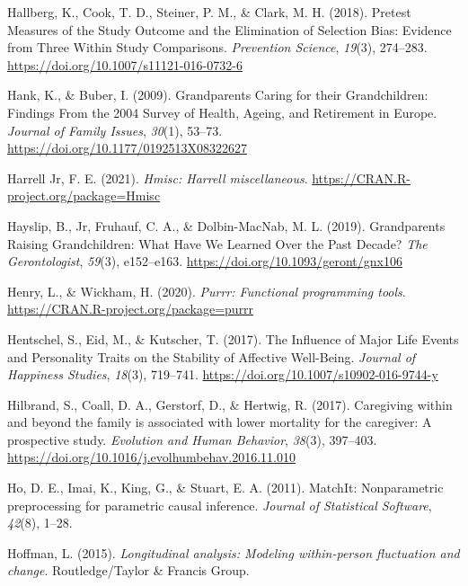 \documentclass[
  english,
  man,floatsintext]{apa7}
\begin{document}
\leavevmode\hypertarget{ref-hallbergPretestMeasuresStudy2018}{}%
Hallberg, K., Cook, T. D., Steiner, P. M., \& Clark, M. H. (2018). Pretest Measures of the Study Outcome and the Elimination of Selection Bias: Evidence from Three Within Study Comparisons. \emph{Prevention Science}, \emph{19}(3), 274--283. \url{https://doi.org/10.1007/s11121-016-0732-6}

\leavevmode\hypertarget{ref-hankGrandparentsCaringTheir2009}{}%
Hank, K., \& Buber, I. (2009). Grandparents Caring for their Grandchildren: Findings From the 2004 Survey of Health, Ageing, and Retirement in Europe. \emph{Journal of Family Issues}, \emph{30}(1), 53--73. \url{https://doi.org/10.1177/0192513X08322627}

\leavevmode\hypertarget{ref-R-Hmisc}{}%
Harrell Jr, F. E. (2021). \emph{Hmisc: Harrell miscellaneous}. \url{https://CRAN.R-project.org/package=Hmisc}

\leavevmode\hypertarget{ref-hayslipGrandparentsRaisingGrandchildren2019}{}%
Hayslip, B., Jr, Fruhauf, C. A., \& Dolbin-MacNab, M. L. (2019). Grandparents Raising Grandchildren: What Have We Learned Over the Past Decade? \emph{The Gerontologist}, \emph{59}(3), e152--e163. \url{https://doi.org/10.1093/geront/gnx106}

\leavevmode\hypertarget{ref-R-purrr}{}%
Henry, L., \& Wickham, H. (2020). \emph{Purrr: Functional programming tools}. \url{https://CRAN.R-project.org/package=purrr}

\leavevmode\hypertarget{ref-hentschelInfluenceMajorLife2017}{}%
Hentschel, S., Eid, M., \& Kutscher, T. (2017). The Influence of Major Life Events and Personality Traits on the Stability of Affective Well-Being. \emph{Journal of Happiness Studies}, \emph{18}(3), 719--741. \url{https://doi.org/10.1007/s10902-016-9744-y}

\leavevmode\hypertarget{ref-hilbrandCaregivingFamilyAssociated2017}{}%
Hilbrand, S., Coall, D. A., Gerstorf, D., \& Hertwig, R. (2017). Caregiving within and beyond the family is associated with lower mortality for the caregiver: A prospective study. \emph{Evolution and Human Behavior}, \emph{38}(3), 397--403. \url{https://doi.org/10.1016/j.evolhumbehav.2016.11.010}

\leavevmode\hypertarget{ref-MatchIt2011}{}%
Ho, D. E., Imai, K., King, G., \& Stuart, E. A. (2011). MatchIt: Nonparametric preprocessing for parametric causal inference. \emph{Journal of Statistical Software}, \emph{42}(8), 1--28.

\leavevmode\hypertarget{ref-hoffmanLongitudinalAnalysisModeling2015}{}%
Hoffman, L. (2015). \emph{Longitudinal analysis: Modeling within-person fluctuation and change}. Routledge/Taylor \& Francis Group.
\end{document}

